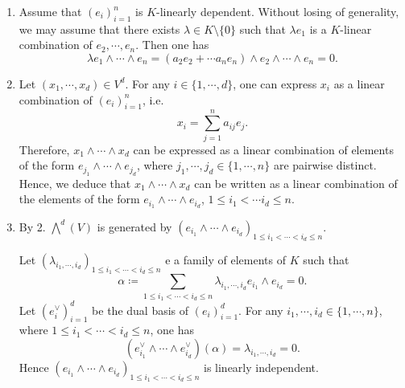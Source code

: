 \begin{proofenv}
    \quad
    \begin{enumerate}
        \item Assume that $\left(e_i\right)_{i=1}^{n}$ is $K$-linearly dependent.
        Without losing of generality, we may assume that there exists $\lambda \in K \setminus \{0\}$ such that $\lambda e_1$ is a $K$-linear combination of $e_2, \cdots, e_n$.
        Then one has
        $$ \lambda e_1 \wedge \cdots \wedge e_n = \left(a_2 e_2 + \cdots a_n e_n\right) \wedge e_2 \wedge \cdots \wedge e_n = 0.$$
        \item Let $(x_1,\cdots, x_d) \in V^d$.
        For any $i \in \{1,\cdots,d\}$, one can express $x_i$ as a linear combination of $\left(e_i\right)_{i=1}^n$, i.e.
        $$ x_i = \sum_{j=1}^n a_{ij} e_j.$$
        Therefore, $x_1 \wedge \cdots \wedge x_d$ can be expressed as a linear combination of elements of the form $e_{j_1} \wedge \cdots \wedge e_{j_d}$, where $j_1,\cdots,j_d \in \{1,\cdots,n\}$ are pairwise distinct.
        Hence, we deduce that $x_1 \wedge \cdots \wedge x_d$ can be written as a linear combination of the elements of the form $e_{i_1} \wedge \cdots \wedge e_{i_d}$, $1 \le i_1 < \cdots i_d \le n$.
        \item By 2. $\bigwedge^d (V)$ is generated by $\left(e_{i_1} \wedge \cdots \wedge e_{i_d}\right)_{1\le i_1 < \cdots < i_d \le n}$.
        
        Let $\left(\lambda_{i_1,\cdots , i_d}\right)_{1\le i_1 < \cdots <i_d\le n}$ e a family of elements of $K$ such that
        $$ \alpha \coloneq \sum_{1 \le i_1 < \cdots <i_d \le n} \lambda_{i_1,\cdots, i_d} e_{i_1} \wedge e_{i_d} = 0.$$
        Let $\left(e_{i}^\vee\right)_{i=1}^d$ be the dual basis of $\left(e_{i}\right)_{i=1}^d$.
        For any $i_1,\cdots,i_d \in \{1,\cdots,n\}$, where $1\le i_1 < \cdots < i_d\le n$, one has
        $$ \left(e_{i_1}^\vee \wedge \cdots \wedge e_{i_d}^\vee\right) \left(\alpha\right) = \lambda_{i_1,\cdots, i_d} = 0.$$
        Hence $\left(e_{i_1} \wedge \cdots \wedge e_{i_d}\right)_{1\le i_1 < \cdots < i_d \le n}$ is linearly independent.
    \end{enumerate}
\end{proofenv}

